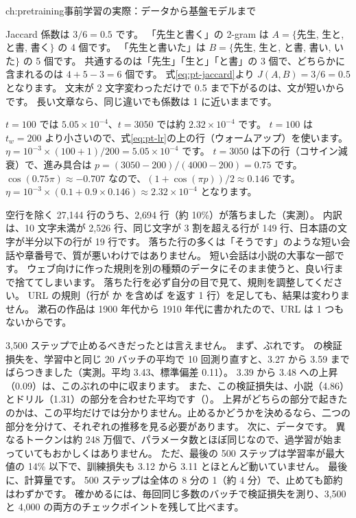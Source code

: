\begin{answers}{ch:pretraining}{事前学習の実際：データから基盤モデルまで}
\item Jaccard 係数は $3/6=0.5$ です。
「先生と書く」の 2-gram は $A=\{$先生, 生と, と書, 書く$\}$ の 4 個です。
「先生と書いた」は $B=\{$先生, 生と, と書, 書い, いた$\}$ の 5 個です。
共通するのは「先生」「生と」「と書」の 3 個で、どちらかに含まれるのは $4+5-3=6$ 個です。
式\eqref{eq:pt-jaccard}より $J(A,B)=3/6=0.5$ となります。
文末が 2 文字変わっただけで 0.5 まで下がるのは、文が短いからです。
長い文章なら、同じ違いでも係数は 1 に近いままです。
\item $t=100$ では $5.05\times10^{-4}$、$t=3050$ では約 $2.32\times10^{-4}$ です。
$t=100$ は $t_w=200$ より小さいので、式\eqref{eq:pt-lr}の上の行（ウォームアップ）を使います。
$\eta=10^{-3}\times(100+1)/200=5.05\times10^{-4}$ です。
$t=3050$ は下の行（コサイン減衰）で、進み具合は $p=(3050-200)/(4000-200)=0.75$ です。
$\cos(0.75\pi)\approx-0.707$ なので、$(1+\cos(\pi p))/2\approx0.146$ です。
$\eta=10^{-3}\times(0.1+0.9\times0.146)\approx2.32\times10^{-4}$ となります。
\item 空行を除く 27,144 行のうち、2,694 行（約 10\%）が落ちました（実測）。
内訳は、10 文字未満が 2,526 行、同じ文字が 3 割を超える行が 149 行、日本語の文字が半分以下の行が 19 行です。
落ちた行の多くは「そうです」のような短い会話や章番号で、質が悪いわけではありません。
短い会話は小説の大事な一部です。
ウェブ向けに作った規則を別の種類のデータにそのまま使うと、良い行まで捨ててしまいます。
落ちた行を必ず自分の目で見て、規則を調整してください。
URL の規則（行が  か  を含めば  を返す 1 行）を足しても、結果は変わりません。
漱石の作品は 1900 年代から 1910 年代に書かれたので、URL は 1 つもないからです。
\item 3,500 ステップで止めるべきだったとは言えません。
まず、ぶれです。
 の検証損失を、学習中と同じ 20 バッチの平均で 10 回測り直すと、3.27 から 3.59 までばらつきました（実測。平均 3.43、標準偏差 0.11）。
3.39 から 3.48 への上昇（0.09）は、このぶれの中に収まります。
また、この検証損失は、小説（4.86）とドリル（1.31）の部分を合わせた平均です（）。
上昇がどちらの部分で起きたのかは、この平均だけでは分かりません。止めるかどうかを決めるなら、二つの部分を分けて、それぞれの推移を見る必要があります。
次に、データです。
異なるトークンは約 248 万個で、パラメータ数とほぼ同じなので、過学習が始まっていてもおかしくはありません。
ただ、最後の 500 ステップは学習率が最大値の 14\% 以下で、訓練損失も 3.12 から 3.11 とほとんど動いていません。
最後に、計算量です。
500 ステップは全体の 8 分の 1（約 4 分）で、止めても節約はわずかです。
確かめるには、毎回同じ多数のバッチで検証損失を測り、3,500 と 4,000 の両方のチェックポイントを残して比べます。
\end{answers}
